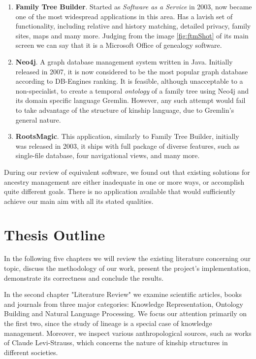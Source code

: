     \begin{enumerate}
        \item{\textbf{Family Tree Builder}. Started as \textit{Software as a Service} in 2003, now became one of the most
            widespread\cite{fambuild} applications in this area. Has a lavish set of functionality, including relative and history
            matching, detailed privacy, family sites, maps and many more. Judging from the image \ref{fig:ftmShot} of its main screen
            we can say that it is a Microsoft Office of genealogy software.}
        \item{\textbf{Neo4j}. A graph database management system\cite{neo4j} written in Java. Initially released in 2007, it is now considered
            to be the most popular graph database according to DB-Engines ranking\cite{rank}. It is feasible, although unacceptable to
            a non-specialist, to create a temporal \textit{ontology} of a family tree using Neo4j and its domain specific language
            Gremlin.  However, any such attempt would fail to take advantage of the structure of kinship language, due to Gremlin's
            general nature.}
        \item{\textbf{RootsMagic}. This application\cite{roots}, similarly to Family Tree Builder, initially was released in 2003, it
            ships with full package of diverse features, such as single-file database, four navigational views, and many more.}
    \end{enumerate}
    During our review of equivalent software, we found out that existing solutions for ancestry management are either inadequate in
    one or more ways, or accomplish quite different goals. There is no application available that would sufficiently achieve our
    main aim with all its stated qualities.

\section{Thesis Outline}
    In the following five chapters we will review the existing literature concerning our topic, discuss the methodology of our work,
    present the project's implementation, demonstrate its correctness and conclude the results.

    In the second chapter "Literature Review" we examine scientific articles, books and journals from three major categories:
    Knowledge Representation, Ontology Building and Natural Language Processing. We focus our attention primarily on the first two,
    since the study of lineage is a special case of knowledge management. Moreover, we inspect various anthropological sources, such
    as works of Claude Levi-Strauss\cite{strauss}, which concerns the nature of kinship structures in different societies.


